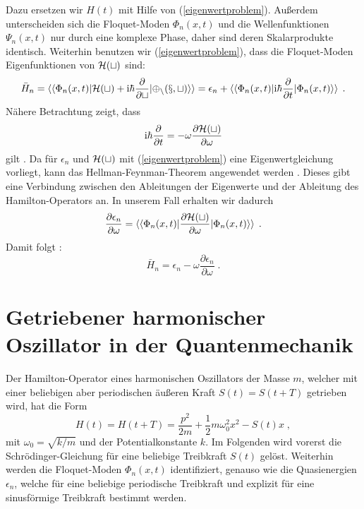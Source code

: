     Dazu ersetzen wir $H(t)$ mit Hilfe von (\ref{eigenwertproblem}).
    Außerdem unterscheiden sich die Floquet-Moden $\Phi_n(x,t)$ und die Wellenfunktionen $\Psi_n(x,t)$ nur durch eine komplexe Phase, daher sind deren Skalarprodukte identisch.
    Weiterhin benutzen wir (\ref{eigenwertproblem}), dass die Floquet-Moden Eigenfunktionen von $\cal{H}(t)$ sind:
    \begin{align}
      \begin{split}
      \bar{H}_n  = \braket{\braket{\Phi_n(x,t)|\cal{H}(t)+\text{i}\hbar\frac{\partial}{\partial t}|\Phi_n(x,t)}}
      = \epsilon_n + \braket{\braket{\Phi_n(x,t)|\text{i}\hbar\frac{\partial}{\partial t}|\Phi_n(x,t)}} \; .
    \end{split}
    \end{align}
    Nähere Betrachtung zeigt, dass
    \begin{equation}
      \text{i}\hbar\frac{\partial}{\partial t} = -\omega \frac{\partial \cal{H}(t)}{\partial \omega}
    \end{equation}
    gilt \cite{haengi}.
    Da für $\epsilon_n$ und $\cal H(t)$ mit (\ref{eigenwertproblem}) eine Eigenwertgleichung vorliegt, kann das Hellman-Feynman-Theorem angewendet werden \cite{hellmann}.
    Dieses gibt eine Verbindung zwischen den Ableitungen der Eigenwerte und der Ableitung des Hamilton-Operators an.
    In unserem Fall erhalten wir dadurch
    \begin{equation}
      \frac{\partial \epsilon_n}{\partial \omega} = \braket{\braket{\Phi_n(x,t)|\frac{\partial \cal H(t)}{\partial \omega}|\Phi_n(x,t)}} \; .
    \end{equation}
    Damit folgt \cite{haengi}:
    \begin{equation}
      \bar{H}_n = \epsilon_n - \omega\frac{\partial \epsilon_n}{\partial \omega} \; .
      \label{mittleres_H}
    \end{equation}

\iffalse
    \chapter{Getriebener harmonischer Oszillator in der Quantenmechanik}
      Der Hamilton-Operator eines harmonischen Oszillators der Masse $m$, welcher mit einer beliebigen aber periodischen äußeren Kraft $S(t)=S(t+T)$ getrieben wird, hat die Form
      \begin{equation}
        H(t) = H(t+T) = \frac{p^2}{2m} + \frac{1}{2}m\omega_0^2x^2-S(t)x \; ,
        \label{H_einzelner}
      \end{equation}
      mit $\omega_0=\sqrt{k/m}$ und der Potentialkonstante $k$.
      Im Folgenden wird vorerst die Schrödinger-Gleichung für eine beliebige Treibkraft $S(t)$ gelöst.
      Weiterhin werden die Floquet-Moden $\Phi_n(x,t)$ identifiziert, genauso wie die Quasienergien $\epsilon_n$, welche für eine beliebige periodische Treibkraft und explizit für eine sinusförmige Treibkraft bestimmt werden.

